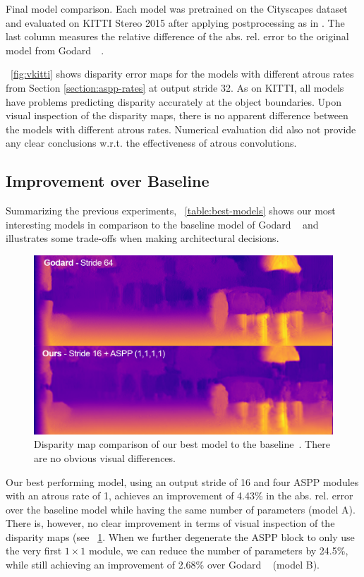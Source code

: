\begin{table}[h!]
   \centering
   \small
   \setlength{\tabcolsep}{4pt}
   
   \caption{Final model comparison.
   Each model was pretrained on the Cityscapes dataset and evaluated on KITTI Stereo 2015 after applying postprocessing as in \cite{Godard_2017_CVPR}. 
   The last column measures the relative difference of the abs. rel. error to the original model from Godard~\etal~\cite{Godard_2017_CVPR}.}
   \label{table:best-models}
\end{table}
\figurename~\ref{fig:vkitti} shows disparity error maps for the models with different atrous rates from Section \ref{section:aspp-rates} at output stride 32. As on KITTI, all models have problems predicting disparity accurately at the object boundaries. Upon visual inspection of the disparity maps, there is no apparent difference between the models with different atrous rates. Numerical evaluation did also not provide any clear conclusions w.r.t. the effectiveness of atrous convolutions.

\subsection{Improvement over Baseline}

Summarizing the previous experiments, \tablename~\ref{table:best-models} shows our most interesting models in comparison to the baseline model of Godard \etal~\cite{Godard_2017_CVPR} and illustrates some trade-offs when making architectural decisions.
\begin{figure}
    \centering
    \includegraphics[width=0.8\linewidth]{images/disparities/final_godard_comparison.png}
    \caption{Disparity map comparison of our best model to the baseline~\cite{Godard_2017_CVPR}. There are no obvious visual differences.}
    \label{fig:final-comparison}
\end{figure}
Our best performing model, using an output stride of 16 and four ASPP modules with an atrous rate of 1, achieves an improvement of 4.43\% in the abs. rel. error over the baseline model while having the same number of parameters (model A). There is, however, no clear improvement in terms of visual inspection of the disparity maps (see \figurename~\ref{fig:final-comparison}.
When we further degenerate the ASPP block to only use the very first $1 \times 1$ module, we can reduce the number of parameters by 24.5\%, while still achieving an improvement of 2.68\% over Godard \etal~\cite{Godard_2017_CVPR} (model B).

